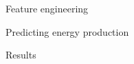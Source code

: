 \documentclass[handout]{beamer}
\begin{document}

\begin{frame}{Feature engineering}

\end{frame}



\begin{frame}{Predicting energy production}

\end{frame}



\begin{frame}{Results}

\end{frame}
\end{document}
